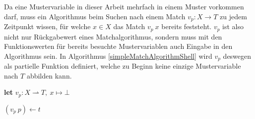 Da eine Mustervariable in dieser Arbeit mehrfach in einem Muster vorkommen darf, muss ein Algorithmus beim Suchen nach einem Match $v_p \colon X \rightarrow T$ zu jedem Zeitpunkt wissen, für welche $x \in X$ das Match $v_p~x$ bereits feststeht. $v_p$ ist also nicht nur Rückgabewert eines Matchalgorithmus, sondern muss mit den Funktionswerten für bereits besuchte Mustervariablen auch Eingabe in den Algorithmus sein. In Algorithmus \ref{simpleMatchAlgorithmShell} wird $v_p$ deswegen als partielle Funktion definiert, welche zu Beginn keine einzige Mustervariable nach $T$ abbilden kann. \\

\begin{algorithm}
\DontPrintSemicolon
\caption{$\Const{simpleMatchAlgorithmShell} \colon M \times T \rightarrow (\mathit{Bool}, X \rightharpoonup T)$}\label{simpleMatchAlgorithmShell}

\textbf{let} $v_p \colon X \rightharpoonup T,~ x \mapsto \bot$\;
\end{algorithm}

\begin{algorithm}
\DontPrintSemicolon
\caption{$\Const{simpleMatchAlgorithm} \colon M \times T \times (X \rightharpoonup T) \rightarrow (\mathit{Bool}, X \rightharpoonup T)$}\label{simpleMatchAlgorithm}

 {
	$(v_p~p) \leftarrow t$\;
}
 {
}
\end{algorithm}


